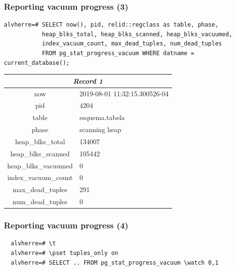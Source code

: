 \documentclass[ignorenonframetext,t]{beamer}
\begin{document}
\begin{frame}[fragile]
  \frametitle{Reporting vacuum progress (3)}

  \footnotesize
  \begin{verbatim}
alvherre=# SELECT now(), pid, relid::regclass as table, phase,
           heap_blks_total, heap_blks_scanned, heap_blks_vacuumed,
           index_vacuum_count, max_dead_tuples, num_dead_tuples
           FROM pg_stat_progress_vacuum WHERE datname = current_database();
\end{verbatim}
\begin{tabular}{c|l}
\multicolumn{2}{c}{\textit{Record 1}} \\
\hline
  now & 2019-08-01 11:32:15.300526-04 \\
pid & 4204 \\
table & esquema.tabela \\
phase & scanning heap \\
heap\_blks\_total & 134007 \\
heap\_blks\_scanned & 105442 \\
heap\_blks\_vacuumed & 0 \\
index\_vacuum\_count & 0 \\
max\_dead\_tuples & 291 \\
num\_dead\_tuples & 0 \\
\end{tabular}
\end{frame}

\begin{frame}[fragile]
  \frametitle{Reporting vacuum progress (4)}

  \begin{verbatim}
  alvherre=# \t
  alvherre=# \pset tuples_only on
  alvherre=# SELECT .. FROM pg_stat_progress_vacuum \watch 0,1
  \end{verbatim}

\end{frame}
\end{document}
